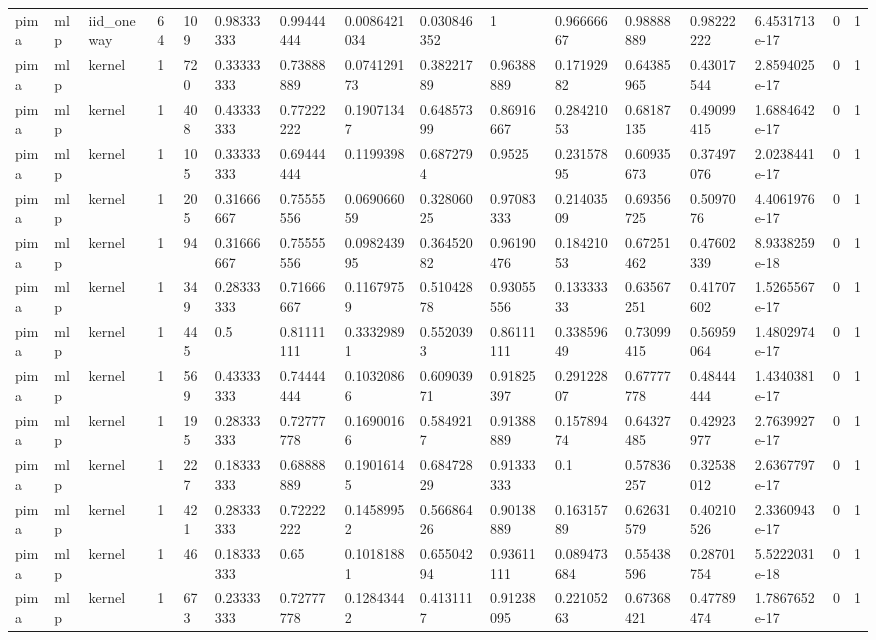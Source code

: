 \begin{tabular}{llllllllllllllll}
pima & mlp & iid\_oneway & 64 & 109 & 0.98333333 & 0.99444444 & 0.0086421034 & 0.030846352 & 1 & 0.96666667 & 0.98888889 & 0.98222222 & 6.4531713e-17 & 0 & 1 \\
pima & mlp & kernel & 1 & 720 & 0.33333333 & 0.73888889 & 0.074129173 & 0.38221789 & 0.96388889 & 0.17192982 & 0.64385965 & 0.43017544 & 2.8594025e-17 & 0 & 1 \\
pima & mlp & kernel & 1 & 408 & 0.43333333 & 0.77222222 & 0.19071347 & 0.64857399 & 0.86916667 & 0.28421053 & 0.68187135 & 0.49099415 & 1.6884642e-17 & 0 & 1 \\
pima & mlp & kernel & 1 & 105 & 0.33333333 & 0.69444444 & 0.1199398 & 0.6872794 & 0.9525 & 0.23157895 & 0.60935673 & 0.37497076 & 2.0238441e-17 & 0 & 1 \\
pima & mlp & kernel & 1 & 205 & 0.31666667 & 0.75555556 & 0.069066059 & 0.32806025 & 0.97083333 & 0.21403509 & 0.69356725 & 0.5097076 & 4.4061976e-17 & 0 & 1 \\
pima & mlp & kernel & 1 & 94 & 0.31666667 & 0.75555556 & 0.098243995 & 0.36452082 & 0.96190476 & 0.18421053 & 0.67251462 & 0.47602339 & 8.9338259e-18 & 0 & 1 \\
pima & mlp & kernel & 1 & 349 & 0.28333333 & 0.71666667 & 0.11679759 & 0.51042878 & 0.93055556 & 0.13333333 & 0.63567251 & 0.41707602 & 1.5265567e-17 & 0 & 1 \\
pima & mlp & kernel & 1 & 445 & 0.5 & 0.81111111 & 0.33329891 & 0.5520393 & 0.86111111 & 0.33859649 & 0.73099415 & 0.56959064 & 1.4802974e-17 & 0 & 1 \\
pima & mlp & kernel & 1 & 569 & 0.43333333 & 0.74444444 & 0.10320866 & 0.60903971 & 0.91825397 & 0.29122807 & 0.67777778 & 0.48444444 & 1.4340381e-17 & 0 & 1 \\
pima & mlp & kernel & 1 & 195 & 0.28333333 & 0.72777778 & 0.16900166 & 0.5849217 & 0.91388889 & 0.15789474 & 0.64327485 & 0.42923977 & 2.7639927e-17 & 0 & 1 \\
pima & mlp & kernel & 1 & 227 & 0.18333333 & 0.68888889 & 0.19016145 & 0.68472829 & 0.91333333 & 0.1 & 0.57836257 & 0.32538012 & 2.6367797e-17 & 0 & 1 \\
pima & mlp & kernel & 1 & 421 & 0.28333333 & 0.72222222 & 0.14589952 & 0.56686426 & 0.90138889 & 0.16315789 & 0.62631579 & 0.40210526 & 2.3360943e-17 & 0 & 1 \\
pima & mlp & kernel & 1 & 46 & 0.18333333 & 0.65 & 0.10181881 & 0.65504294 & 0.93611111 & 0.089473684 & 0.55438596 & 0.28701754 & 5.5222031e-18 & 0 & 1 \\
pima & mlp & kernel & 1 & 673 & 0.23333333 & 0.72777778 & 0.12843442 & 0.4131117 & 0.91238095 & 0.22105263 & 0.67368421 & 0.47789474 & 1.7867652e-17 & 0 & 1 \\

\end{tabular}
